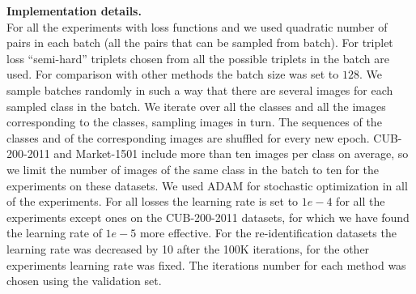 \noindent\textbf{Implementation details.}\\
For all the experiments with loss functions  and  we used quadratic number of pairs in each batch (all the pairs that can be sampled from batch). For triplet loss ``semi-hard'' triplets chosen from all the possible triplets in the batch are used. For comparison with other methods the batch size was set to $128$. We sample batches randomly in such a way that there are several images for each  sampled class in the batch. We iterate over all the classes and all the images corresponding to the classes, sampling images in turn. The sequences of the classes and of the corresponding images are shuffled for every new epoch. CUB-200-2011 and Market-1501 include more than ten images per class on average, so we limit the number of images of the same class in the batch to ten for the experiments on these datasets. We used ADAM \citep{Kingma14} for stochastic optimization in all of the experiments. For all losses the learning rate is set to $1e-4$ for all the experiments except ones on the CUB-200-2011 datasets, for which we have found the learning rate of $1e-5$ more effective. 
For the re-identification datasets the learning rate was decreased by 10 after the 100K iterations, for the other experiments learning rate was fixed. The iterations number for each method was chosen using the validation set.

